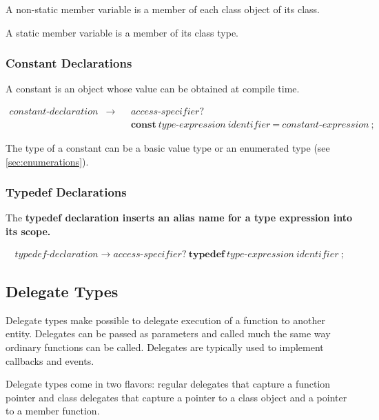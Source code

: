 \documentclass[a4paper,oneside,11pt]{article}
\begin{document}
A non-static member variable is a member of each class object of its class.

A static member variable is a member of its class type.

\subsubsection{Constant Declarations}\label{constantdeclaration}

A constant is an object whose value can be obtained at compile time.

\begin{align*}
constant\textrm{-}declaration &\rightarrow  & &\hyperref[accessspecifier]{access\textrm{-}specifier}?\\
& & &\textbf{const} \> \hyperref[typeexpr]{type\textrm{-}expression} \> \hyperref[identifier]{identifier} \> \texttt{=} \>
\hyperref[constantexpr]{constant\textrm{-}expression} \> \texttt{;}
\end{align*}

The type of a constant can be a basic value type or an enumerated type (see \ref{sec:enumerations}).

\subsubsection{Typedef Declarations}\label{typedefdeclaration}

The \bf{typedef} declaration inserts an alias name for a type expression into its scope.

\begin{align*}
typedef\textrm{-}declaration \rightarrow \hyperref[accessspecifier]{access\textrm{-}specifier}? \> \textbf{typedef} \>
\hyperref[typeexpr]{type\textrm{-}expression} \> \hyperref[identifier]{identifier} \> \texttt{;}
\end{align*}

\subsection{Delegate Types}

Delegate types make possible to delegate execution of a function to another entity.
Delegates can be passed as parameters and called much the same way ordinary functions can be called.
Delegates are typically used to implement callbacks and events.

Delegate types come in two flavors: regular delegates that capture a function pointer and
class delegates that capture a pointer to a class object and a pointer to a member function.
\end{document}
